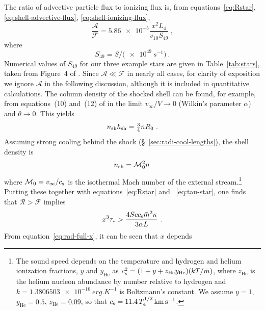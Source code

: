The ratio of advective particle flux to ionizing flux is, from
equations~\eqref{eq:Rstar}, \eqref{eq:shell-advective-flux},
\eqref{eq:shell-ionizing-flux},
\begin{equation}
  \label{eq:advective-over-ionizing-flux}
  \frac{\mathcal{A}}{\mathcal{F}} = \num{5.86e-5} \frac{x^2 L_4}{v_{10} S_{49}} \ , 
\end{equation}
where
\begin{equation*}
  S_{49} = S / \bigl( \SI{e49}{s^{-1}} \bigr) \ .
\end{equation*}
Numerical values of \(S_{49}\) for our three example stars are given
in Table~\ref{tab:stars}, taken from Figure~4 of
\citet{Sternberg:2003a}.  Since \(\mathcal{A} \ll \mathcal{F}\) in
nearly all cases, for clarity of exposition we ignore \(\mathcal{A}\)
in the following discussion, although it is included in quantitative
calculations.  The column density of the shocked shell can be found,
for example, from equations~(10) and~(12) of \citet{Wilkin:1996a} in
the limit \(v_\infty/V \to 0\) (Wilkin's parameter \(\alpha\)) and
\(\theta \to 0\).  This yields
\begin{equation}
  \label{eq:shocked-shell-column}
  n\shell h\shell = \tfrac34 n R_0 \ .
\end{equation}
Assuming strong cooling behind the shock
(\S~\ref{sec:radi-cool-lengths}), the shell density is
\begin{equation}
  \label{eq:isothermal-shell-density}
  n\shell = \mathcal{M}_0^2 n \,
\end{equation}
where
\(\mathcal{M}_0 = v_\infty / \sound\) is the isothermal Mach number of the
external stream.\footnote{%
  \label{fn:temperature-dependence}
  The sound speed depends on the temperature and hydrogen and helium
  ionization fractions, \(y\) and \(y_{\text{He}}\) as
  \(\sound^2 = (1 + y + z_{\text{He}} y_{\text{He}}) (k T /
  \bar{m})\), where \(z_{\text{He}}\) is the helium nucleon abundance
  by number relative to hydrogen and
  \(k = \SI{1.3806503e-16}{erg.K^{-1}}\) is Boltzmann's constant.  We
  assume \(y = 1\), \(y_{\text{He}} = 0.5\), \(z_{\text{He}} = 0.09\),
  so that \(\sound = \num{11.4}\, T_4^{1/2}\, \si{km.s^{-1}}\). } %
Putting these together with equations~\eqref{eq:Rstar} and
~\eqref{eq:tau-star}, one finds that \(\mathcal{R} > \mathcal{F}\)
implies
\begin{equation}
  \label{eq:ifront-trap-x-cubed-taustar}
  x^3 \tau_* > \frac{4 S c \sound \bar{m}^2 \kappa}{3 \alpha L} \ .
\end{equation}
From equation~\eqref{eq:rad-full-x}, it can be seen that \(x\) depends
